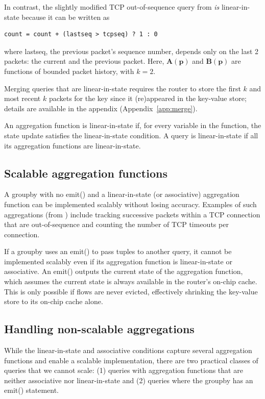 In contrast, the slightly modified TCP out-of-sequence query from  {\em is}
linear-in-state because it can be written as
\begin{lstlisting}
count = count + (lastseq > tcpseq) ? 1 : 0
\end{lstlisting}
where {\ct lastseq}, the previous packet's sequence number, depends only on the last 2 packets: the current and the previous packet. Here,
$\boldsymbol{A}(\mathbf{p})$ and $\boldsymbol{B}(\mathbf{p})$ are functions of bounded packet history,
with $k = 2$.

Merging queries that are linear-in-state requires the router to store
the first $k$ and most recent $k$ packets
for the key since it (re)appeared in the key-value store; details are
available in the appendix (Appendix~\ref{app:merge}).

An aggregation function is linear-in-state
if, for every variable in the function, the state update
satisfies the linear-in-state condition. A query is linear-in-state
if all its aggregation functions are linear-in-state.

\subsection{Scalable aggregation functions}
\label{sec:scalable}
A {\ct groupby} with no {\ct emit()} and a linear-in-state (or associative) aggregation function
can be implemented scalably without losing accuracy. Examples of such
aggregations (from ) include tracking successive
packets within a TCP connection that are out-of-sequence and counting the
number of TCP timeouts per connection.
%

 If a
{\ct groupby} uses an {\ct emit()} to pass tuples to another query, it cannot be
implemented scalably even if its aggregation function is linear-in-state or associative. An {\ct emit()} outputs the current state of the
aggregation function, which assumes the current state is always available in
the router's on-chip cache. This is only possible if flows are never evicted,
effectively shrinking the key-value store to its on-chip cache alone.

\subsection{Handling non-scalable aggregations}
\label{sec:workaround-nonscalable}
While the linear-in-state and associative conditions capture several
aggregation functions and enable a scalable implementation, there are two
practical classes of queries that we cannot scale: (1) queries with aggregation
functions that are neither associative nor linear-in-state and (2) queries where
the groupby has an {\ct emit()} statement.


